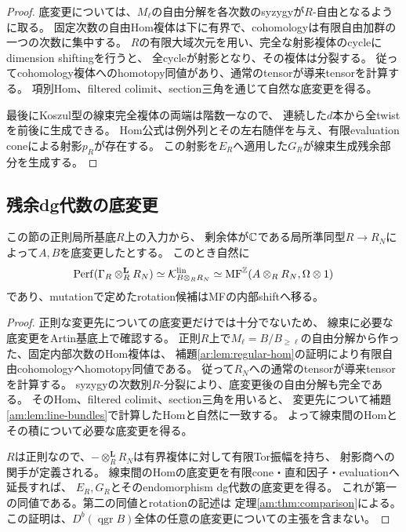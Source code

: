 \begin{proof}
底変更については、$M_\ell$の自由分解を各次数のsyzygyが$R$-自由となるように取る。
固定次数の自由Hom複体は下に有界で、cohomologyは有限自由加群の一つの次数に集中する。
$R$の有限大域次元を用い、完全な射影複体のcycleにdimension shiftingを行うと、
全cycleが射影となり、その複体は分裂する。
従ってcohomology複体へのhomotopy同値があり、通常のtensorが導来tensorを計算する。
項別Hom、filtered colimit、section三角を通じて自然な底変更を得る。

最後にKoszul型の線束完全複体の両端は階数一なので、
連続した$d$本から全twistを前後に生成できる。
Hom公式は例外列とその左右随伴を与え、有限evaluation coneによる射影$p_R$が存在する。
この射影を$E_R$へ適用した$G_R$が線束生成残余部分を生成する。
\end{proof}

\subsection{残余dg代数の底変更}

\begin{proposition}\label{am:prop:Gamma-basechange}
この節の正則局所基底$R$上の入力から、
剰余体が$\mathbb C$である局所準同型$R\to R_N$によって$A,B$を底変更したとする。
このとき自然に
\[
 \operatorname{Perf}(\Gamma_R\otimes_R^{\mathbf L}R_N)
 \simeq\mathcal K_{B\otimes_RR_N}^{\rm lin}
 \simeq\operatorname{MF}^{\mathbb Z}(A\otimes_RR_N,\Omega\otimes1)
\]
であり、mutationで定めたrotation候補はMFの内部shiftへ移る。
\end{proposition}

\begin{proof}
正則な変更先についての底変更だけでは十分でないため、
線束に必要な底変更をArtin基底上で確認する。
正則$R$上で$M_\ell=B/B_{\ge\ell}$の自由分解から作った、固定内部次数のHom複体は、
補題\ref{ar:lem:regular-hom}の証明により有限自由cohomologyへhomotopy同値である。
従って$R_N$への通常のtensorが導来tensorを計算する。
syzygyの次数別$R$-分裂により、底変更後の自由分解も完全である。
そのHom、filtered colimit、section三角を用いると、
変更先について補題\ref{am:lem:line-bundles}で計算したHomと自然に一致する。
よって線束間のHomとその積について必要な底変更を得る。

$R$は正則なので、$-\otimes_R^{\mathbf L}R_N$は有界複体に対して有限Tor振幅を持ち、
射影商への関手が定義される。
線束間のHomの底変更を有限cone・直和因子・evaluationへ延長すれば、
$E_R,G_R$とそのendomorphism dg代数の底変更を得る。
これが第一の同値である。第二の同値とrotationの記述は
定理\ref{am:thm:comparison}による。
この証明は、$D^b(\operatorname{qgr}B)$全体の任意の底変更についての主張を含まない。
\end{proof}

